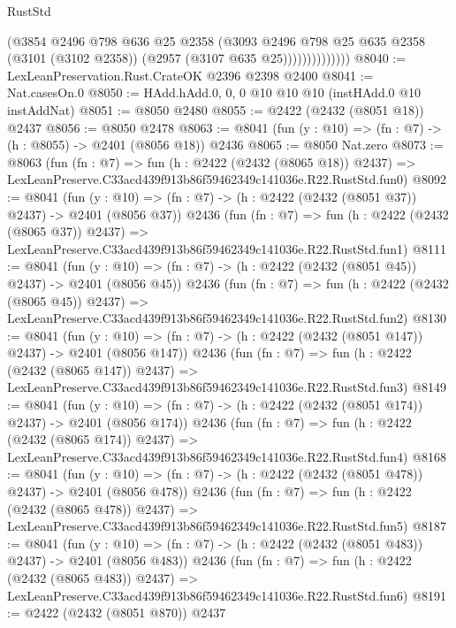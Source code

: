 \begin{lexlean}{RustStd}
\begin{coremodule}
                        (@3854
                          @2496
                          @798
                          @636
                          @25
                          @2358
                          (@3093
                            @2496
                            @798
                            @25
                            @635
                            @2358
                            (@3101 (@3102 @2358))
                            (@2957 (@3107 @635 @25))))))))))))))
@8040 := LexLeanPreservation.Rust.CrateOK @2396 @2398 @2400
@8041 := Nat.casesOn.{0}
@8050 := HAdd.hAdd.{0, 0, 0} @10 @10 @10 (instHAdd.{0} @10 instAddNat)
@8051 := @8050 @2480
@8055 := @2422 (@2432 (@8051 @18)) @2437
@8056 := @8050 @2478
@8063 := @8041 (fun (y : @10) => (fn : @7) -> (h : @8055) -> @2401 (@8056 @18)) @2436
@8065 := @8050 Nat.zero
@8073 := @8063
    (fun (fn : @7) =>
    fun (h : @2422 (@2432 (@8065 @18)) @2437) =>
    LexLeanPreserve.C33acd439f913b86f59462349c141036e.R22.RustStd.fun0)
@8092 := @8041
    (fun (y : @10) => (fn : @7) -> (h : @2422 (@2432 (@8051 @37)) @2437) -> @2401 (@8056 @37))
    @2436
    (fun (fn : @7) =>
    fun (h : @2422 (@2432 (@8065 @37)) @2437) =>
    LexLeanPreserve.C33acd439f913b86f59462349c141036e.R22.RustStd.fun1)
@8111 := @8041
    (fun (y : @10) => (fn : @7) -> (h : @2422 (@2432 (@8051 @45)) @2437) -> @2401 (@8056 @45))
    @2436
    (fun (fn : @7) =>
    fun (h : @2422 (@2432 (@8065 @45)) @2437) =>
    LexLeanPreserve.C33acd439f913b86f59462349c141036e.R22.RustStd.fun2)
@8130 := @8041
    (fun (y : @10) => (fn : @7) -> (h : @2422 (@2432 (@8051 @147)) @2437) -> @2401 (@8056 @147))
    @2436
    (fun (fn : @7) =>
    fun (h : @2422 (@2432 (@8065 @147)) @2437) =>
    LexLeanPreserve.C33acd439f913b86f59462349c141036e.R22.RustStd.fun3)
@8149 := @8041
    (fun (y : @10) => (fn : @7) -> (h : @2422 (@2432 (@8051 @174)) @2437) -> @2401 (@8056 @174))
    @2436
    (fun (fn : @7) =>
    fun (h : @2422 (@2432 (@8065 @174)) @2437) =>
    LexLeanPreserve.C33acd439f913b86f59462349c141036e.R22.RustStd.fun4)
@8168 := @8041
    (fun (y : @10) => (fn : @7) -> (h : @2422 (@2432 (@8051 @478)) @2437) -> @2401 (@8056 @478))
    @2436
    (fun (fn : @7) =>
    fun (h : @2422 (@2432 (@8065 @478)) @2437) =>
    LexLeanPreserve.C33acd439f913b86f59462349c141036e.R22.RustStd.fun5)
@8187 := @8041
    (fun (y : @10) => (fn : @7) -> (h : @2422 (@2432 (@8051 @483)) @2437) -> @2401 (@8056 @483))
    @2436
    (fun (fn : @7) =>
    fun (h : @2422 (@2432 (@8065 @483)) @2437) =>
    LexLeanPreserve.C33acd439f913b86f59462349c141036e.R22.RustStd.fun6)
@8191 := @2422 (@2432 (@8051 @870)) @2437

\end{coremodule}
\end{lexlean}
